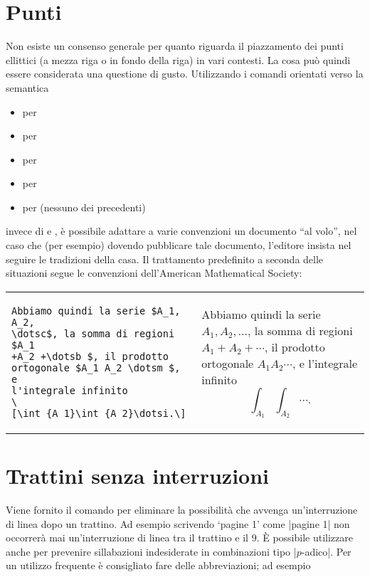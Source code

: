 \documentclass[a4paper,leqno,titlepage,openany]{amsldoc}[1999/12/13]
\begin{document}
\section{Punti}
Non esiste un consenso generale per quanto riguarda il piazzamento dei
punti ellittici (a mezza riga o in fondo della riga) in vari contesti.
La cosa pu\`o quindi essere considerata una questione di gusto.
Utilizzando i comandi orientati verso la semantica
\begin{itemize}
\item {} per 
\item {} per 
\item {} per 
\item {} per 
\item {} per  (nessuno dei precedenti)
\end{itemize}
invece di  e , \`e possibile adattare a varie
convenzioni un documento ``al volo'', nel caso che (per esempio)
dovendo pubblicare tale documento, l'editore insista nel seguire le
tradizioni della casa. Il trattamento predefinito a seconda delle
situazioni segue le convenzioni dell'American Mathematical Society:
\begin{center}
\begin{tabular}{@{}l@{}l@{}}
\begin{minipage}[t]{.54\textwidth}
\begin{verbatim}
Abbiamo quindi la serie $A_1, A_2,
\dotsc$, la somma di regioni $A_1
+A_2 +\dotsb $, il prodotto
ortogonale $A_1 A_2 \dotsm $, e
l'integrale infinito
\[\int_{A_1}\int_{A_2}\dotsi.\]
\end{verbatim}
\end{minipage}
&
\begin{minipage}[t]{.45\textwidth}
\noindent
Abbiamo quindi la serie $A_1, A_2,
\dotsc$, la somma di regioni $A_1
+A_2 +\dotsb $, il prodotto
ortogonale $A_1 A_2 \dotsm $, e
l'integrale infinito
\[\int_{A_1}\int_{A_2}\dotsi.\]
\end{minipage}
\end{tabular}
\end{center}

\section{Trattini senza interruzioni}
Viene fornito il comando  per eliminare la
possibilit\`{a} che avvenga un'interruzione di linea dopo un trattino.
Ad esempio scrivendo `pagine 1'  come |pagine 1|
non occorrer\`{a} mai un'interruzione di linea tra il trattino e il 9.
\`E possibile utilizzare  anche per prevenire
sillabazioni indesiderate in combinazioni tipo |$p$-adico|. Per un
utilizzo frequente \`e consigliato fare delle abbreviazioni; ad
esempio
\end{document}
